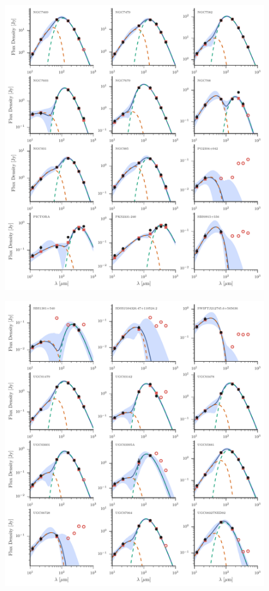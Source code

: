 \begin{figure}
\centering
\includegraphics[width=\textwidth]{figures/sedfig24}
\caption{}
\end{figure}

\begin{figure}
\centering
\includegraphics[width=\textwidth]{figures/sedfig25}
\caption{}
\end{figure}


